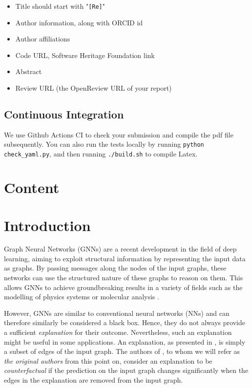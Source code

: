 \begin{itemize}
\item Title should start with "\texttt{[Re]}"
\item Author information, along with ORCID id
\item Author affiliations
\item Code URL, Software Heritage Foundation link
\item Abstract
\item Review URL (the OpenReview URL of your report)
\end{itemize}

\subsection{Continuous Integration}

We use Github Actions CI to check your submission and compile the pdf file subsequently.
You can also run the tests locally by running \texttt{python check\_yaml.py}, and then running \texttt{./build.sh} to compile Latex.

\clearpage

\section{Content}

\section{Introduction}
Graph Neural Networks (GNNs) \cite{gnnOG} are a recent development in the field of deep learning, aiming to exploit structural information by representing the input data as graphs. By passing messages along the nodes of the input graphs, these networks can use the structured nature of these graphs to reason on them. This allows GNNs to achieve groundbreaking results in a variety of fields such as the modelling of physics systems or molecular analysis \cite{zhou2020GNNGeneral}.

However, GNNs are similar to conventional neural networks (NNs) and can therefore similarly be considered a black box. Hence, they do not always provide a sufficient \textit{explanation} for their outcome. Nevertheless, such an explanation might be useful in some applications. An explanation, as presented in \cite{bajaj2021robust}, is simply a subset of edges of the input graph. The authors of \cite{bajaj2021robust}, to whom we will refer as \textit{the original authors} from this point on, consider an explanation to be \textit{counterfactual} if the prediction on the input graph changes significantly when the edges in the explanation are removed from the input graph.
  
